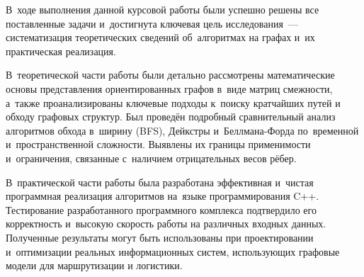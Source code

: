 В~ходе выполнения данной курсовой работы были успешно решены все поставленные задачи и~достигнута ключевая цель исследования~--- систематизация теоретических сведений об~алгоритмах на графах и~их практическая реализация.

В~теоретической части работы были детально рассмотрены математические основы представления ориентированных графов в~виде матриц смежности, а~также проанализированы ключевые подходы к~поиску кратчайших путей и обходу графовых структур. Был проведён подробный сравнительный анализ алгоритмов обхода в~ширину (BFS), Дейкстры и~Беллмана-Форда по~временной и~пространственной сложности. Выявлены их границы применимости и~ограничения, связанные с~наличием отрицательных весов рёбер.

В~практической части работы была разработана эффективная и~чистая программная реализация алгоритмов на~языке программирования C++. Тестирование разработанного программного комплекса подтвердило его корректность и~высокую скорость работы на различных входных данных. Полученные результаты могут быть использованы при проектировании и~оптимизации реальных информационных систем, использующих графовые модели для маршрутизации и логистики.
